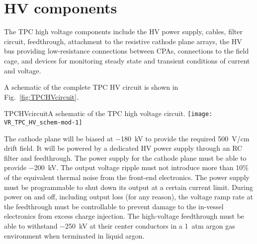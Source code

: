 




\section{HV components}

The TPC high voltage components include the HV power supply, cables,
filter circuit, feedthrough, attachment to the resistive cathode plane
arrays, the HV bus providing low-resistance connections between CPAs,
connections to the field cage, and devices for monitoring steady state
and transient conditions of current and voltage.

A schematic of the complete TPC HV circuit is shown in Fig.\ \ref{fig:TPCHVcircuit}.

\begin{cdrfigure}{TPCHVcircuit}{A schematic of the TPC high voltage circuit.}
  \texttt{[image: VR\_TPC\_HV\_schem-mod-1]}
\end{cdrfigure}


The cathode plane will be biased at \SI{-180}{kV} to provide the
required \SI{500}{V/cm} drift field.  It will be
powered by a dedicated HV power supply through an RC filter and
feedthrough.  The power supply for the cathode plane must be able
to provide \SI{-200}{kV}.  The output voltage
ripple must not introduce more than 10\%
of the equivalent thermal
noise from the front-end electronics. The power supply must be
programmable to shut down its output at a certain current
limit. During power on and off, including output loss (for any
reason), the voltage ramp rate at the feedthrough must be controllable
to prevent damage to the in-vessel electronics from excess charge
injection. The high-voltage feedthrough must be able to withstand \SI{-250}{kV}
at their center conductors in a \SI{1}{atm} argon gas environment when
terminated in liquid argon.

